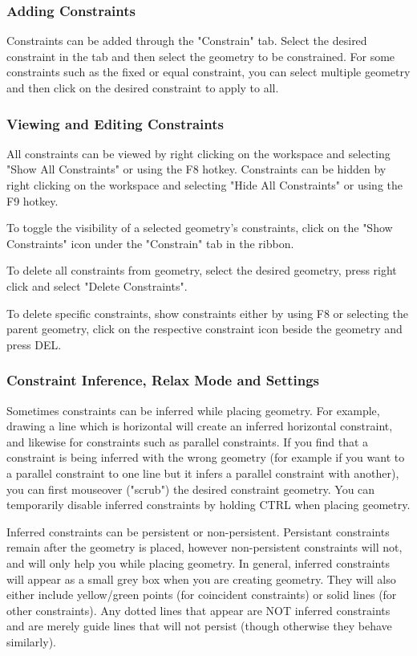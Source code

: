 \subsubsection{Adding Constraints}
Constraints can be added through the "Constrain" tab. Select the desired constraint in the tab and then select the geometry to be constrained. For some constraints such as the fixed or equal constraint, you can select multiple geometry and then click on the desired constraint to apply to all.

\subsubsection{Viewing and Editing Constraints}
All constraints can be viewed by right clicking on the workspace and selecting "Show All Constraints" or using the F8 hotkey. Constraints can be hidden by right clicking on the workspace and selecting "Hide All Constraints" or using the F9 hotkey.

To toggle the visibility of a selected geometry's constraints, click on the "Show Constraints" icon under the "Constrain" tab in the ribbon.

To delete all constraints from geometry, select the desired geometry, press right click and select "Delete Constraints".

To delete specific constraints, show constraints either by using F8 or selecting the parent geometry, click on the respective constraint icon beside the geometry and press DEL.

\subsubsection{Constraint Inference, Relax Mode and Settings}

Sometimes constraints can be inferred while placing geometry. For example, drawing a line which is horizontal will create an inferred horizontal constraint, and likewise for constraints such as parallel constraints. If you find that a constraint is being inferred with the wrong geometry (for example if you want to a parallel constraint to one line but it infers a parallel constraint with another), you can first mouseover ("scrub") the desired constraint geometry. You can temporarily disable inferred constraints by holding CTRL when placing geometry.

Inferred constraints can be persistent or non-persistent. Persistant constraints remain after the geometry is placed, however non-persistent constraints will not, and will only help you while placing geometry. In general, inferred constraints will appear as a small grey box when you are creating geometry. They will also either include yellow/green points (for coincident constraints) or solid lines (for other constraints). Any dotted lines that appear are NOT inferred constraints and are merely guide lines that will not persist (though otherwise they behave similarly).

